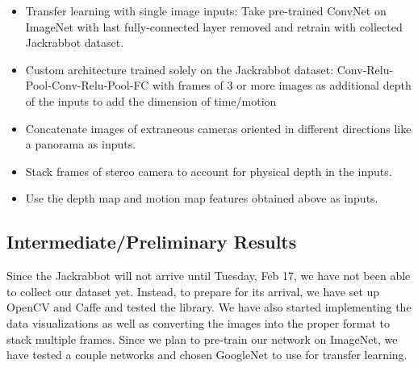 \documentclass[10pt,twocolumn,letterpaper]{article}
\begin{document}
\begin{itemize}
\item Transfer learning with single image inputs: Take pre-trained ConvNet on ImageNet with last fully-connected layer removed and retrain with collected Jackrabbot dataset.
\item Custom architecture trained solely on the Jackrabbot dataset: Conv-Relu-Pool-Conv-Relu-Pool-FC with frames of 3 or more images as additional depth of the inputs to add the dimension of time/motion
\item Concatenate images of extraneous cameras oriented in different directions like a panorama as inputs.
\item Stack frames of stereo camera to account for physical depth in the inputs.
\item Use the depth map and motion map features obtained above as inputs.
\end{itemize}

\subsection{Intermediate/Preliminary Results}
Since the Jackrabbot will not arrive until Tuesday, Feb 17, we have not been able to collect our dataset yet. Instead, to prepare for its arrival, we have set up OpenCV and Caffe and tested the library. We have also started implementing the data visualizations as well as converting the images into the proper format to stack multiple frames. Since we plan to pre-train our network on ImageNet, we have tested a couple networks and chosen GoogleNet to use for transfer learning.
\end{document}
